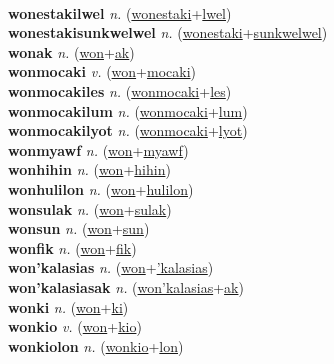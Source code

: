  \label{wonestakilum} \\
\textbf{wonestakilwel} \textit{n.} (\hyperref[wonestaki]{wonestaki}+\hyperref[lwel]{lwel})
 \label{wonestakilwel} \\
\textbf{wonestakisunkwelwel} \textit{n.} (\hyperref[wonestaki]{wonestaki}+\hyperref[sunkwelwel]{sunkwelwel})
 \label{wonestakisunkwelwel} \\
\textbf{wonak} \textit{n.} (\hyperref[won]{won}+\hyperref[ak]{ak})
 \label{wonak} \\
\textbf{wonmocaki} \textit{v.} (\hyperref[won]{won}+\hyperref[mocaki]{mocaki})
 \label{wonmocaki} \\
\textbf{wonmocakiles} \textit{n.} (\hyperref[wonmocaki]{wonmocaki}+\hyperref[les]{les})
 \label{wonmocakiles} \\
\textbf{wonmocakilum} \textit{n.} (\hyperref[wonmocaki]{wonmocaki}+\hyperref[lum]{lum})
 \label{wonmocakilum} \\
\textbf{wonmocakilyot} \textit{n.} (\hyperref[wonmocaki]{wonmocaki}+\hyperref[lyot]{lyot})
 \label{wonmocakilyot} \\
\textbf{wonmyawf} \textit{n.} (\hyperref[won]{won}+\hyperref[myawf]{myawf})
 \label{wonmyawf} \\
\textbf{wonhihin} \textit{n.} (\hyperref[won]{won}+\hyperref[hihin]{hihin})
 \label{wonhihin} \\
\textbf{wonhulilon} \textit{n.} (\hyperref[won]{won}+\hyperref[hulilon]{hulilon})
 \label{wonhulilon} \\
\textbf{wonsulak} \textit{n.} (\hyperref[won]{won}+\hyperref[sulak]{sulak})
 \label{wonsulak} \\
\textbf{wonsun} \textit{n.} (\hyperref[won]{won}+\hyperref[sun]{sun})
 \label{wonsun} \\
\textbf{wonfik} \textit{n.} (\hyperref[won]{won}+\hyperref[fik]{fik})
 \label{wonfik} \\
\textbf{won'kalasias} \textit{n.} (\hyperref[won]{won}+\hyperref['kalasias]{'kalasias})
 \label{won'kalasias} \\
\textbf{won'kalasiasak} \textit{n.} (\hyperref[won'kalasias]{won'kalasias}+\hyperref[ak]{ak})
 \label{won'kalasiasak} \\
\textbf{wonki} \textit{n.} (\hyperref[won]{won}+\hyperref[ki]{ki})
 \label{wonki} \\
\textbf{wonkio} \textit{v.} (\hyperref[won]{won}+\hyperref[kio]{kio})
 \label{wonkio} \\
\textbf{wonkiolon} \textit{n.} (\hyperref[wonkio]{wonkio}+\hyperref[lon]{lon})
 \label{wonkiolon} \\
